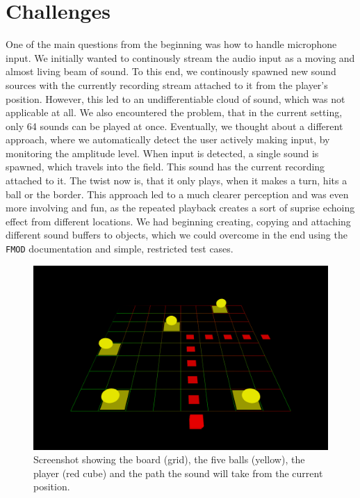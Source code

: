\documentclass[conference]{IEEEtran}
\begin{document}
\section{Challenges}
One of the main questions from the beginning was how to handle microphone input.
We initially wanted to continously stream the audio input as a moving and almost living beam of sound.
To this end, we continously spawned new sound sources with the currently recording stream attached to it from the player's position. 
However, this led to an undifferentiable cloud of sound, which was not applicable at all.
We also encountered the problem, that in the current setting, only 64 sounds can be played at once.
Eventually, we thought about a different approach, where we automatically detect the user actively making input, by monitoring the amplitude level. 
When input is detected, a single sound is spawned, which travels into the field.
This sound has the current recording attached to it.
The twist now is, that it only plays, when it makes a turn, hits a ball or the border.
This approach led to a much clearer perception and was even more involving and fun, as the repeated playback creates a sort of suprise echoing effect from different locations.
We had beginning creating, copying and attaching different sound buffers to objects, which we could overcome in the end using the \texttt{FMOD} documentation and simple, restricted test cases.
% 
% 
\begin{figure}[b]
    \centering
    \includegraphics[width=\linewidth]{img/gameplay1.png}
    \vspace{-1em}
    \caption{Screenshot showing the board (grid), the five balls (yellow), the player (red cube) and the path the sound will take from the current position.}
    \label{fig:board}
    \vspace{-1em}
\end{figure}
\end{document}
